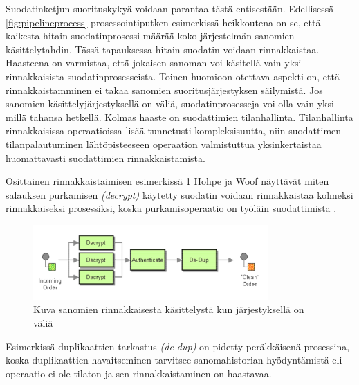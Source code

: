       Suodatinketjun suorituskykyä voidaan parantaa tästä entisestään. Edellisessä \ref{fig:pipelineprocess} prosessointiputken esimerkissä heikkoutena on se, että kaikesta hitain suodatinprosessi määrää koko järjestelmän sanomien käsittelytahdin. 
      Tässä tapauksessa hitain suodatin voidaan rinnakkaistaa. Haasteena on varmistaa, että jokaisen sanoman voi käsitellä vain yksi rinnakkaisista suodatinprosesseista. 
      Toinen huomioon otettava aspekti on, että rinnakkaistamminen ei takaa sanomien suoritusjärjestyksen säilymistä. Jos sanomien käsittelyjärjestyksellä on väliä, suodatinprosesseja voi olla vain yksi millä tahansa hetkellä. 
      Kolmas haaste on suodattimien tilanhallinta. Tilanhallinta rinnakkaisissa operaatioissa lisää tunnetusti kompleksisuutta, niin suodattimen tilanpalautuminen lähtöpisteeseen operaation valmistuttua yksinkertaistaa huomattavasti suodattimien rinnakkaistamista.

      Osittainen rinnakkaistaimisen  esimerkissä \ref{fig:parallelprocess} Hohpe ja Woof näyttävät miten salauksen purkamisen \textit{(decrypt)} käytetty suodatin voidaan rinnakkaistaa kolmeksi rinnakkaiseksi prosessiksi, koska purkamisoperaatio on työläin suodattimista \citep{Hohpe2004}.
      \begin{figure}[!h]
      \begin{center}
      \includegraphics[width=0.8\textwidth]{kuvat/paraller_processing.png}
      \caption{Kuva sanomien rinnakkaisesta käsittelystä kun järjestyksellä on väliä \citep{Hohpe2004}\label{fig:parallelprocess}}
      \end{center}
      \end{figure}
      Esimerkissä duplikaattien tarkastus \textit{(de-dup)} on pidetty peräkkäisenä prosessina, koska duplikaattien havaitseminen tarvitsee sanomahistorian hyödyntämistä eli operaatio ei ole tilaton ja sen rinnakkaistaminen on haastavaa. 


